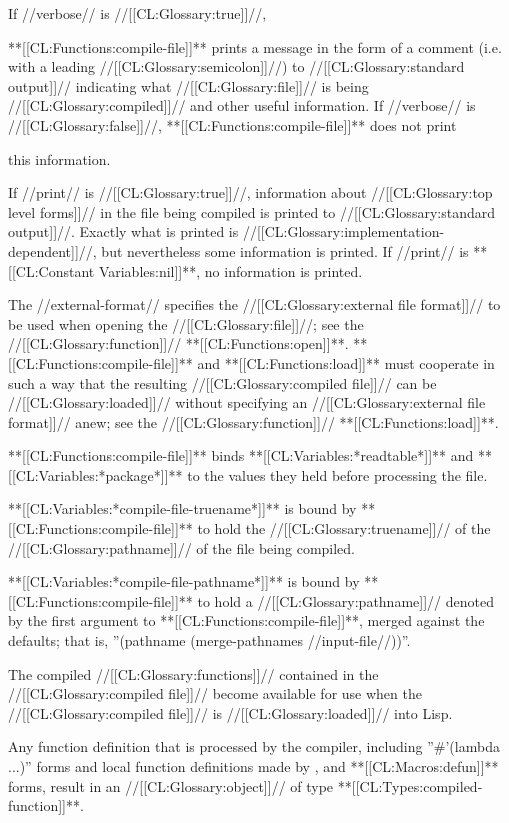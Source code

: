 If //verbose// is //[[CL:Glossary:true]]//,

**[[CL:Functions:compile-file]]** prints a message in the form of a comment (i.e. with a leading //[[CL:Glossary:semicolon]]//) to //[[CL:Glossary:standard output]]// indicating what //[[CL:Glossary:file]]// is being //[[CL:Glossary:compiled]]// and other useful information. If //verbose// is //[[CL:Glossary:false]]//, **[[CL:Functions:compile-file]]** does not print

this information.

If //print// is //[[CL:Glossary:true]]//, information about //[[CL:Glossary:top level forms]]// in the file being compiled is printed to //[[CL:Glossary:standard output]]//. Exactly what is printed is //[[CL:Glossary:implementation-dependent]]//, but nevertheless some information is printed. If //print// is **[[CL:Constant Variables:nil]]**, no information is printed.

The //external-format// specifies the //[[CL:Glossary:external file format]]// to be used when opening the //[[CL:Glossary:file]]//; see the //[[CL:Glossary:function]]// **[[CL:Functions:open]]**. **[[CL:Functions:compile-file]]** and **[[CL:Functions:load]]** must cooperate in such a way that the resulting //[[CL:Glossary:compiled file]]// can be //[[CL:Glossary:loaded]]// without specifying an //[[CL:Glossary:external file format]]// anew; see the //[[CL:Glossary:function]]// **[[CL:Functions:load]]**.

**[[CL:Functions:compile-file]]** binds **[[CL:Variables:*readtable*]]** and **[[CL:Variables:*package*]]** to the values they held before processing the file.

**[[CL:Variables:*compile-file-truename*]]** is bound by **[[CL:Functions:compile-file]]** to hold the //[[CL:Glossary:truename]]// of the //[[CL:Glossary:pathname]]// of the file being compiled.

**[[CL:Variables:*compile-file-pathname*]]** is bound by **[[CL:Functions:compile-file]]** to hold a //[[CL:Glossary:pathname]]// denoted by the first argument to **[[CL:Functions:compile-file]]**, merged against the defaults; that is, ''(pathname (merge-pathnames //input-file//))''.

The compiled //[[CL:Glossary:functions]]// contained in the //[[CL:Glossary:compiled file]]// become available for use when the //[[CL:Glossary:compiled file]]// is //[[CL:Glossary:loaded]]// into Lisp.

Any function definition that is processed by the compiler, including ''#'(lambda ...)'' forms and local function definitions made by ,  and **[[CL:Macros:defun]]** forms, result in an //[[CL:Glossary:object]]// of type **[[CL:Types:compiled-function]]**.

